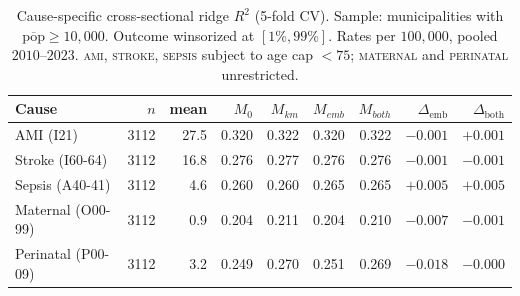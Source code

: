 \begin{table}[h!]
\centering
\caption{Cause-specific cross-sectional ridge $R^2$ (5-fold CV). Sample: municipalities with $\overline{\mathrm{pop}} \ge 10{,}000$. Outcome winsorized at $[1\%, 99\%]$. Rates per $100{,}000$, pooled $2010\text{--}2023$. \textsc{ami}, \textsc{stroke}, \textsc{sepsis} subject to age cap $<75$; \textsc{maternal} and \textsc{perinatal} unrestricted.}
\label{tab:cause-specific}
\small
\begin{tabular}{lrrrrrrrr}
\toprule
Cause & $n$ & mean & $M_0$ & $M_{km}$ & $M_{emb}$ & $M_{both}$ & $\Delta_{\mathrm{emb}}$ & $\Delta_{\mathrm{both}}$ \\
\midrule
AMI (I21)              &  3112 &   27.5 & 0.320 & 0.322 & 0.320 & 0.322 & $-0.001$ & $+0.001$ \\
Stroke (I60-64)        &  3112 &   16.8 & 0.276 & 0.277 & 0.276 & 0.276 & $-0.001$ & $-0.001$ \\
Sepsis (A40-41)        &  3112 &    4.6 & 0.260 & 0.260 & 0.265 & 0.265 & $+0.005$ & $+0.005$ \\
Maternal (O00-99)      &  3112 &    0.9 & 0.204 & 0.211 & 0.204 & 0.210 & $-0.007$ & $-0.001$ \\
Perinatal (P00-09)     &  3112 &    3.2 & 0.249 & 0.270 & 0.251 & 0.269 & $-0.018$ & $-0.000$ \\
\bottomrule
\end{tabular}
\end{table}

